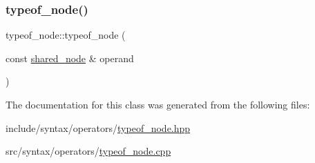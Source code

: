 \subsubsection{\texorpdfstring{typeof\+\_\+node()}{typeof\_node()}}
{\footnotesize\ttfamily typeof\+\_\+node\+::typeof\+\_\+node (\begin{DoxyParamCaption}\item[{const \hyperlink{namespacejawe_a3f307481d921b6cbb50cc8511fc2b544}{shared\+\_\+node} \&}]{operand }\end{DoxyParamCaption})}



The documentation for this class was generated from the following files\+:\begin{DoxyCompactItemize}
\item 
include/syntax/operators/\hyperlink{typeof__node_8hpp}{typeof\+\_\+node.\+hpp}\item 
src/syntax/operators/\hyperlink{typeof__node_8cpp}{typeof\+\_\+node.\+cpp}\end{DoxyCompactItemize}
